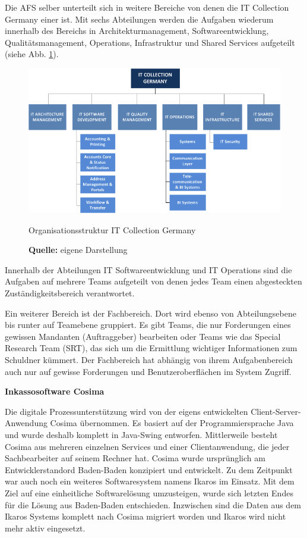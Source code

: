 Die \gls{AFS} selber unterteilt sich in weitere Bereiche von denen die IT Collection Germany einer ist. Mit sechs Abteilungen werden die Aufgaben wiederum innerhalb des Bereichs in Architekturmanagement, Softwareentwicklung, Qualitätsmanagement, Operations, Infrastruktur und Shared Services aufgeteilt (siehe Abb. \ref{fig:organisationsstruktur}).
\begin{figure}[H]
  \centering
  \includegraphics[scale=0.78]{img/IT_Collection_Germany_Organisation.png}
  \caption{Organisationsstruktur IT Collection Germany}
  \caption*{\textbf{Quelle:} eigene Darstellung}
  \label{fig:organisationsstruktur}
\end{figure}
Innerhalb der Abteilungen IT Softwareentwicklung und IT Operations sind die Aufgaben auf mehrere Teams aufgeteilt von denen jedes Team einen abgesteckten Zuständigkeitsbereich verantwortet.

Ein weiterer Bereich ist der Fachbereich. Dort wird ebenso von Abteilungsebene bis runter auf Teamebene gruppiert. Es gibt Teams, die nur Forderungen eines gewissen Mandanten (Auftraggeber) bearbeiten oder Teams wie das Special Research Team (SRT), das sich um die Ermittlung wichtiger Informationen zum Schuldner kümmert. Der Fachbereich hat abhängig von ihrem Aufgabenbereich auch nur auf gewisse Forderungen und Benutzeroberflächen im System Zugriff.

\textbf{Inkassosoftware Cosima}

Die digitale Prozessunterstützung wird von der eigens entwickelten Client-Server-Anwendung Cosima übernommen. Es basiert auf der Programmiersprache Java und wurde deshalb komplett in Java-Swing entworfen. Mittlerweile besteht Cosima aus mehreren einzelnen Services und einer Clientanwendung, die jeder Sachbearbeiter auf seinem Rechner hat. Cosima wurde ursprünglich am Entwicklerstandord Baden-Baden konzipiert und entwickelt. Zu dem Zeitpunkt war auch noch ein weiteres Softwaresystem namens Ikaros im Einsatz. Mit dem Ziel auf eine einheitliche Softwarelösung umzusteigen, wurde sich letzten Endes für die Lösung aus Baden-Baden entschieden. Inzwischen sind die Daten aus dem Ikaros Systems komplett nach Cosima migriert worden und Ikaros wird nicht mehr aktiv eingesetzt.

